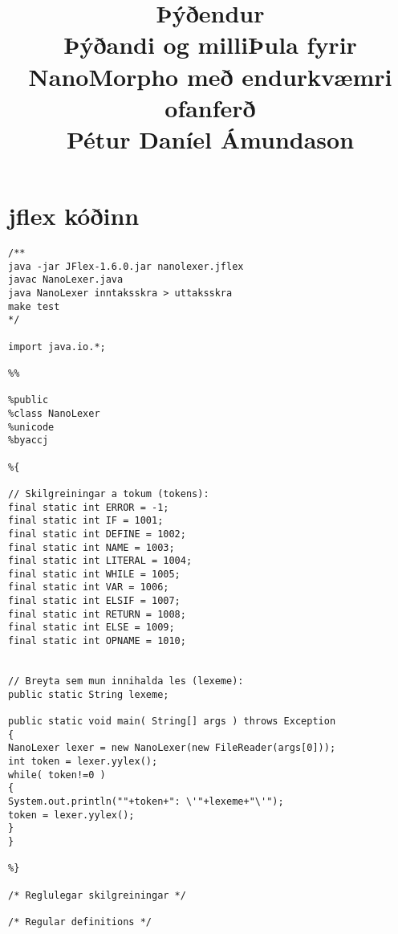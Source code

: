 \documentclass[]{article}
\begin{document}
\title{Þýðendur \\
	Þýðandi og milliÞula fyrir NanoMorpho með endurkvæmri ofanferð\\
	Pétur Daníel Ámundason\\
	}
\maketitle


\section*{jflex kóðinn}
\begin{lstlisting}
/**
java -jar JFlex-1.6.0.jar nanolexer.jflex
javac NanoLexer.java
java NanoLexer inntaksskra > uttaksskra
make test
*/

import java.io.*;

%%

%public
%class NanoLexer
%unicode
%byaccj

%{

// Skilgreiningar a tokum (tokens):
final static int ERROR = -1;
final static int IF = 1001;
final static int DEFINE = 1002;
final static int NAME = 1003;
final static int LITERAL = 1004;
final static int WHILE = 1005;
final static int VAR = 1006;
final static int ELSIF = 1007;
final static int RETURN = 1008;
final static int ELSE = 1009;
final static int OPNAME = 1010;


// Breyta sem mun innihalda les (lexeme):
public static String lexeme;

public static void main( String[] args ) throws Exception
{
NanoLexer lexer = new NanoLexer(new FileReader(args[0]));
int token = lexer.yylex();
while( token!=0 )
{
System.out.println(""+token+": \'"+lexeme+"\'");
token = lexer.yylex();
}
}

%}

/* Reglulegar skilgreiningar */

/* Regular definitions */


\end{lstlisting}
\end{document}
